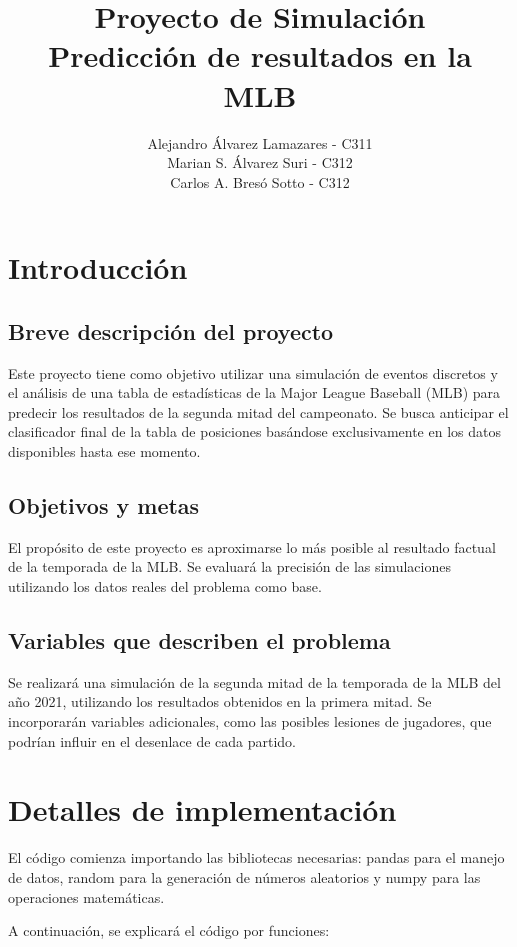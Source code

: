 \documentclass{article}
\title{Proyecto de Simulación	
    \\
    \large Predicción de resultados en la MLB}
\author{Alejandro Álvarez Lamazares - C311
\\
        Marian S. Álvarez Suri - C312
        \\
        Carlos A. Bresó Sotto - C312}
\date{}
\begin{document}
    \maketitle
    \large

    \section{Introducción}

        \subsection{Breve descripción del proyecto}
            Este proyecto tiene como objetivo utilizar una simulación de eventos discretos y el análisis de una tabla de estadísticas de la Major League Baseball (MLB) para predecir los resultados de la segunda mitad del campeonato. Se busca anticipar el clasificador final de la tabla de posiciones basándose exclusivamente en los datos disponibles hasta ese momento.

        \subsection{Objetivos y metas}
            El propósito de este proyecto es aproximarse lo más posible al resultado factual de la temporada de la MLB. Se evaluará la precisión de las simulaciones utilizando los datos reales del problema como base.

        \subsection{Variables que describen el problema}
            Se realizará una simulación de la segunda mitad de la temporada de la MLB del año 2021, utilizando los resultados obtenidos en la primera mitad. Se incorporarán variables adicionales, como las posibles lesiones de jugadores, que podrían influir en el desenlace de cada partido.

    \section{Detalles de implementación}

        El código comienza importando las bibliotecas necesarias: pandas para el manejo de datos, random para la generación de números aleatorios y numpy para las operaciones matemáticas.

        A continuación, se explicará el código por funciones:
\end{document}
